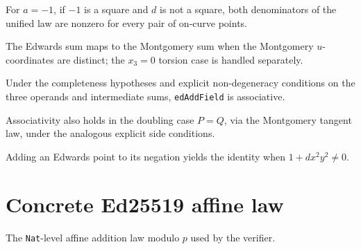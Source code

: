 \begin{lemma}
  \label{lem:edwards_denoms_ne_zero}
  \leanok
  For $a = -1$, if $-1$ is a square and $d$ is not a square, both denominators
  of the unified law are nonzero for every pair of on-curve points.
\end{lemma}

\begin{lemma}
  \label{thm:secant_compat}
  \leanok
  The Edwards sum maps to the Montgomery sum when the Montgomery $u$-coordinates
  are distinct; the $x_3 = 0$ torsion case is handled separately.
\end{lemma}

\begin{theorem}
  \label{thm:field_assoc}
  \leanok
  Under the completeness hypotheses and explicit non-degeneracy conditions on
  the three operands and intermediate sums, \texttt{edAddField} is associative.
\end{theorem}

\begin{theorem}
  \label{thm:field_assoc_double}
  \leanok
  Associativity also holds in the doubling case $P = Q$, via the Montgomery
  tangent law, under the analogous explicit side conditions.
\end{theorem}

\begin{lemma}
  \label{lem:edwards_neg}
  \leanok
  Adding an Edwards point to its negation yields the identity when
  $1 + d x^2 y^2 \neq 0$.
\end{lemma}

\section{Concrete Ed25519 affine law}

\begin{definition}
  \label{def:affineAdd}
  \leanok
  The \texttt{Nat}-level affine addition law modulo $p$ used by the verifier.
\end{definition}

